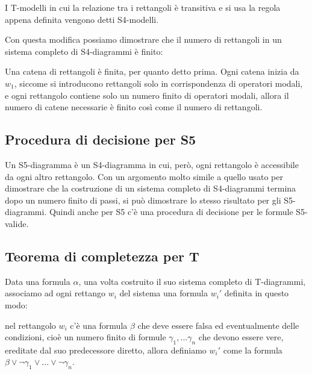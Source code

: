 \documentclass[a4paper, 12pt]{article}
\begin{document}
I T-modelli in cui la relazione tra i rettangoli è transitiva e si usa la regola
appena definita vengono detti S4-modelli.

Con questa modifica possiamo dimostrare che il numero di rettangoli in un sistema
completo di S4-diagrammi è finito:

Una catena di rettangoli è finita, per quanto detto prima.
Ogni catena inizia da $w_1$, siccome si introducono rettangoli
solo in corrispondenza di operatori modali, e ogni rettangolo contiene solo un numero finito
di operatori modali, allora il numero di catene necessarie è finito
così come il numero di rettangoli.

\subsection{Procedura di decisione per S5}
Un S5-diagramma è un S4-diagramma in cui, però, ogni rettangolo è accessibile
da ogni altro rettangolo. Con un argomento molto simile a quello usato
per dimostrare che la costruzione di un sistema completo di S4-diagrammi termina dopo
un numero finito di passi, si può dimostrare lo stesso risultato per gli S5-diagrammi.
Quindi anche per S5 c'è una procedura di decisione per le formule S5-valide.


\subsection{Teorema di completezza per T}
Data una formula $\alpha$, una volta costruito il suo sistema completo di T-diagrammi,
associamo ad ogni rettango $w_i$ del sistema una formula $w_i'$ definita in questo modo:

nel rettangolo $w_i$ c'è una formula $\beta$ che deve essere falsa ed eventualmente delle condizioni,
cioè un numero finito di formule $\gamma_1, ...\gamma_n$ che devono essere vere, ereditate
dal suo predecessore diretto, allora definiamo $w_i'$ come la formula
$\beta \lor \neg \gamma_1 \lor ... \lor \neg \gamma_n$.
\end{document}
